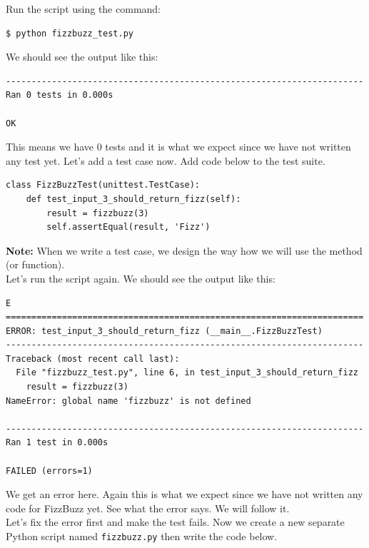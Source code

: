 \documentclass{article}
\begin{document}
\noindent Run the script using the command:

\begin{verbatim}
$ python fizzbuzz_test.py
\end{verbatim}

\noindent We should see the output like this:

\begin{verbatim}
----------------------------------------------------------------------
Ran 0 tests in 0.000s

OK
\end{verbatim}

\noindent This means we have 0 tests and it is what we expect since we have not
written any test yet. Let's add a test case now. Add code below to the test
suite.

\begin{verbatim}
class FizzBuzzTest(unittest.TestCase):
    def test_input_3_should_return_fizz(self):
        result = fizzbuzz(3)
        self.assertEqual(result, 'Fizz')
\end{verbatim}

\noindent \textbf{Note:} When we write a test case, we design the way how we
will use the method (or function). \\

\noindent Let's run the script again. We should see the output like this:

\begin{verbatim}
E
======================================================================
ERROR: test_input_3_should_return_fizz (__main__.FizzBuzzTest)
----------------------------------------------------------------------
Traceback (most recent call last):
  File "fizzbuzz_test.py", line 6, in test_input_3_should_return_fizz
    result = fizzbuzz(3)
NameError: global name 'fizzbuzz' is not defined

----------------------------------------------------------------------
Ran 1 test in 0.000s

FAILED (errors=1)
\end{verbatim}

\noindent We get an error here. Again this is what we expect since we have not
written any code for FizzBuzz yet. See what the error says. We will follow it.
\\

\noindent Let's fix the error first and make the test fails. Now we create a
new separate Python script named {\tt fizzbuzz.py} then write the code below.
\end{document}
